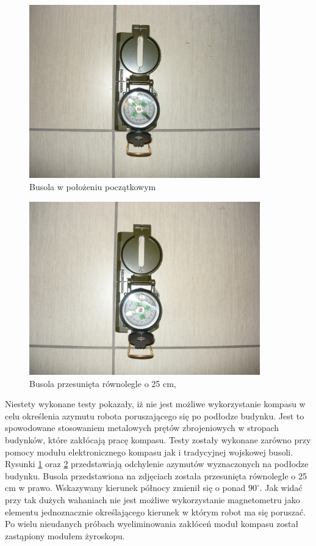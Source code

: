 \begin{figure}[!ht]
 \centering
 \includegraphics[height=75mm]{../images/ch04/compass01.jpg}
 \caption{Busola w położeniu początkowym}
 \label{fig:Busola1}
\end{figure}

\begin{figure}[!ht]
 \centering
 \includegraphics[height=75mm]{../images/ch04/compass02.jpg}
 \caption{Busola przesunięta równolegle o 25 cm,}
 \label{fig:Busola2}
\end{figure}

Niestety wykonane testy pokazały, iż nie jest możliwe wykorzystanie kompasu w celu określenia azymutu robota poruszającego się po podłodze budynku. Jest to spowodowane stosowaniem metalowych prętów zbrojeniowych w stropach budynków, które zakłócają pracę kompasu. Testy zostały wykonane zarówno przy pomocy modułu elektronicznego kompasu jak i tradycyjnej wojskowej busoli. Rysunki \ref{fig:Busola1} oraz \ref{fig:Busola2} przedstawiają odchylenie azymutów wyznaczonych na podłodze budynku. Busola przedstawiona na zdjęciach została przesunięta równolegle o 25 cm w prawo. Wskazywany kierunek północy zmienił się o ponad $90^{\circ}$. Jak widać przy tak dużych wahaniach nie jest możliwe wykorzystanie magnetometru jako elementu jednoznacznie określającego kierunek w którym robot ma się poruszać. Po wielu nieudanych próbach wyeliminowania zakłóceń moduł kompasu został zastąpiony modułem żyroskopu.

